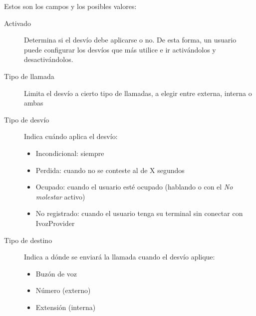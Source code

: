 \documentclass[letterpaper,10pt,spanish]{sphinxmanual}
\begin{document}
\label{pbx_features/users:fwd-to-vm}
Estos son los campos y los posibles valores:
\begin{description}
\item[{Activado}] \leavevmode{}\label{pbx_features/users:term-enabled}
Determina si el desvío debe aplicarse o no. De esta forma, un usuario puede configurar los desvíos que más utilice e ir activándolos y desactivándolos.

\item[{Tipo de llamada}] \leavevmode{}\label{pbx_features/users:term-call-type}
Limita el desvío a cierto tipo de llamadas, a elegir entre externa, interna o ambas

\item[{Tipo de desvío}] \leavevmode{}\label{pbx_features/users:term-forward-type}
Indica cuándo aplica el desvío:
\begin{itemize}
\item {} 
Incondicional: siempre

\item {} 
Perdida: cuando no se conteste al de X segundos

\item {} 
Ocupado: cuando el usuario esté ocupado (hablando o con el \emph{No molestar} activo)

\item {} 
No registrado: cuando el usuario tenga su terminal sin conectar con IvozProvider

\end{itemize}

\item[{Tipo de destino}] \leavevmode{}\label{pbx_features/users:term-target-type}
Indica a dónde se enviará la llamada cuando el desvío aplique:
\begin{itemize}
\item {} 
Buzón de voz

\item {} 
Número (externo)

\item {} 
Extensión (interna)

\end{itemize}

\end{description}
\end{document}
